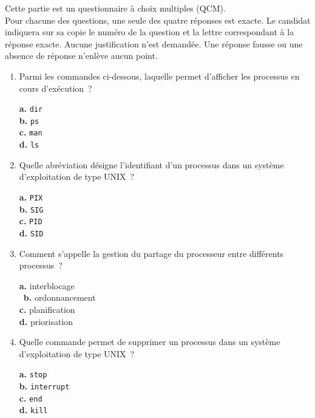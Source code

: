 \documentclass[a4paper,12pt,french]{book}
\begin{document}
Cette partie est un questionnaire à choix multiples (QCM).\\
Pour chacune des questions, une seule des quatre réponses est exacte. Le candidat indiquera sur sa copie le numéro de la question et la lettre correspondant à la réponse exacte.
Aucune justification n’est demandée. Une réponse fausse ou une absence de réponse n’enlève aucun point.
\begin{enumerate}[\bfseries 1.]
	\item 	Parmi les commandes ci-dessous, laquelle permet d’afficher les processus en cours d’exécution ?
            \begin{multicols}{4}
             \textbf{a.} \texttt{dir}\\
                       \textbf{b.} \texttt{ps}\\
                        \textbf{c.} \texttt{man}\\
                        \textbf{d.} \texttt{ls}
            \end{multicols}


   \item Quelle abréviation désigne l’identifiant d’un processus dans un système d’exploitation de type UNIX ?
         \begin{multicols}{4}
                 \textbf{a.} \texttt{PIX}\\
                           \textbf{b.} \texttt{SIG}\\
                            \textbf{c.} \texttt{PID}\\
                            \textbf{d.} \texttt{SID}
                \end{multicols}


     \item Comment s’appelle la gestion du partage du processeur entre différents processus ?
         \begin{multicols}{4}
                 \textbf{a.} interblocage\\\
                           \textbf{b.} ordonnancement\\
                            \textbf{c.} planification\\
                            \textbf{d.} priorisation
                \end{multicols}

      \item Quelle commande permet de supprimer un processus dans un système d’exploitation de type UNIX ?

         \begin{multicols}{4}
                 \textbf{a.} \texttt{stop}\\
                           \textbf{b.} \texttt{interrupt}\\
                            \textbf{c.} \texttt{end}\\
                            \textbf{d.} \texttt{kill}
                \end{multicols}
\end{enumerate}
\end{document}
